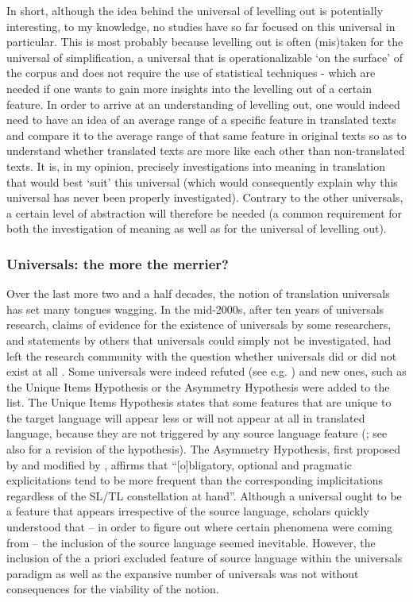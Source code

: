 In short, although the idea behind the universal of levelling out is potentially interesting, to my knowledge, no studies have so far focused on this universal in particular. This is most probably because levelling out is often (mis)taken for the universal of simplification, a universal that is operationalizable ‘on the surface’ of the corpus and does not require the use of statistical techniques - which are needed if one wants to gain more insights into the levelling out of a certain feature. In order to arrive at an understanding of levelling out, one would indeed need to have an idea of an average range of a specific feature in translated texts and compare it to the average range of that same feature in original texts so as to understand whether translated texts are more like each other than non-translated texts. It is, in my opinion, precisely investigations into meaning in translation that would best ‘suit’ this universal (which would consequently explain why this universal has never been properly investigated). Contrary to the other universals, a certain level of abstraction will therefore be needed (a common requirement for both the investigation of meaning as well as for the universal of levelling out).

\subsubsection{Universals: the more the merrier?}
\label{sec:2.2.2.5}  
Over the last more two and a half decades, the notion of translation universals has set many tongues wagging. In the mid-2000s, after ten years of universals research, claims of evidence for the existence of universals by some researchers, and statements by others that universals could simply not be investigated, had left the research community with the question whether universals did or did not exist at all \citep[1]{Mauranen2004}. Some universals were indeed refuted (see e.g. \citealt{becher_abandoning_2010}) and new ones, such as the Unique Items Hypothesis  \citep{mauranen_unique_2004} or the Asymmetry Hypothesis \citep{dimitriu_asymmetry_2009} were added to the list. The Unique Items Hypothesis states that some features that are unique to the target language will appear less or will not appear at all in translated language, because they are not triggered by any source language feature  (\citealt{mauranen_unique_2004}; see also \citealt{gambier_what_2004} for a revision of the hypothesis). The Asymmetry Hypothesis, first proposed by \citet{dimitriu_asymmetry_2009} and modified by \citet{becher_abandoning_2010}, affirms that “[o]bligatory, optional and pragmatic explicitations tend to be more frequent than the corresponding implicitations regardless of the SL/TL constellation at hand”. Although a universal ought to be a feature that appears irrespective of the source language, scholars quickly understood that – in order to figure out where certain phenomena were coming from – the inclusion of the source language seemed inevitable. However, the inclusion of the a priori excluded feature of source language within the universals paradigm as well as the expansive number of universals was not without consequences for the viability of the notion. 

